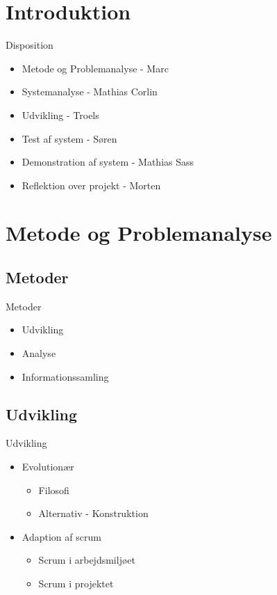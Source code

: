 \section{Introduktion}

\begin{frame}{Disposition}
\begin{itemize}
   \item Metode og Problemanalyse - Marc
   \item Systemanalyse - Mathias Corlin
   \item Udvikling - Troels
   \item Test af system - Søren
   \item Demonstration af system - Mathias Sass
   \item Reflektion over projekt - Morten
\end{itemize}
\end{frame}

\section{Metode og Problemanalyse}
\subsection{Metoder}
\begin{frame}{Metoder}
\begin{itemize}
   \item Udvikling
   \item Analyse
   \item Informationssamling
\end{itemize}
\end{frame}

\subsection{Udvikling}
\begin{frame}{Udvikling}
\begin{itemize}
   \item Evolutionær
   \begin{itemize}
      \item Filosofi
      \item Alternativ - Konstruktion
   \end{itemize}
   \item Adaption af scrum
   \begin{itemize}
      \item Scrum i arbejdsmiljøet
      \item Scrum i projektet
   \end{itemize}
\end{itemize}
\end{frame}


